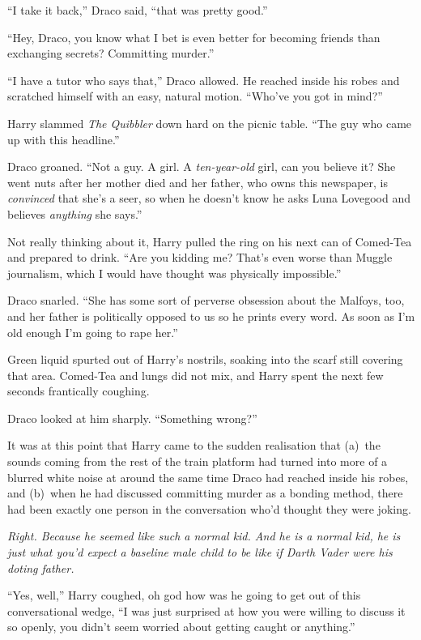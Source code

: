 “I take it back,” Draco said, “that was pretty good.”

“Hey, Draco, you know what I bet is even better for becoming friends than exchanging secrets? Committing murder.”

“I have a tutor who says that,” Draco allowed. He reached inside his robes and scratched himself with an easy, natural motion. “Who’ve you got in mind?”

Harry slammed \emph{The Quibbler} down hard on the picnic table. “The guy who came up with this headline.”

Draco groaned. “Not a guy. A girl. A \emph{ten-year-old} girl, can you believe it? She went nuts after her mother died and her father, who owns this newspaper, is \emph{convinced} that she’s a seer, so when he doesn’t know he asks Luna Lovegood and believes \emph{anything} she says.”

Not really thinking about it, Harry pulled the ring on his next can of Comed-Tea and prepared to drink. “Are you kidding me? That’s even worse than Muggle journalism, which I would have thought was physically impossible.”

Draco snarled. “She has some sort of perverse obsession about the Malfoys, too, and her father is politically opposed to us so he prints every word. As soon as I’m old enough I’m going to rape her.”

Green liquid spurted out of Harry’s nostrils, soaking into the scarf still covering that area. Comed-Tea and lungs did not mix, and Harry spent the next few seconds frantically coughing.

Draco looked at him sharply. “Something wrong?”

It was at this point that Harry came to the sudden realisation that (a)~the sounds coming from the rest of the train platform had turned into more of a blurred white noise at around the same time Draco had reached inside his robes, and (b)~when he had discussed committing murder as a bonding method, there had been exactly one person in the conversation who’d thought they were joking.

\emph{Right. Because he \emph{seemed} like such a normal kid. And he \emph{is} a normal kid, he is just what you’d \emph{expect} a baseline male child to be like if Darth Vader were his doting father.}

“Yes, well,” Harry coughed, oh god how was he going to get out of this conversational wedge, “I was just surprised at how you were willing to discuss it so openly, you didn’t seem worried about getting caught or anything.”


